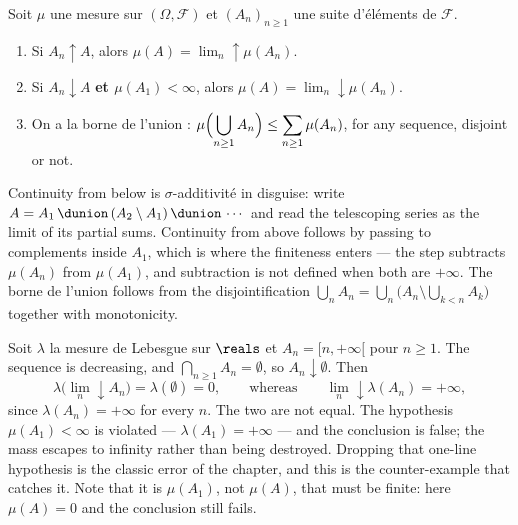 \begin{prop}
  Soit $\mu$ une mesure sur $(\Omega,\mathcal{F})$ et $(A_{n})_{n \geq 1}$ une suite
  d'éléments de $\mathcal{F}$.
  \begin{enumerate}
    \item Si $A_{n} \uparrow A$, alors $\mu(A) = \lim_{n} \uparrow \mu(A_{n})$.
    \item Si $A_{n} \downarrow A$ \textbf{et $\mu(A_{1}) < \infty$}, alors $\mu(A) =
      \lim_{n} \downarrow \mu(A_{n})$.
    \item On a la borne de l'union :
      $\displaystyle \mu\Bigl(\bigcup_{n \geq 1} A_{n}\Bigr) \leq \sum_{n \geq 1}
      \mu(A_{n})$, for any sequence, disjoint or not.
  \end{enumerate}
\end{prop}

\begin{remark}
  Continuity from below is $\sigma$-additivité in disguise: write $A = A_{1}
  \,\dunion\, (A_{2} \setminus A_{1}) \,\dunion\, \cdots$ and read the
  telescoping series as the limit of its partial sums. Continuity from above follows
  by passing to complements inside $A_{1}$, which is where the finiteness enters ---
  the step subtracts $\mu(A_{n})$ from $\mu(A_{1})$, and subtraction is not defined
  when both are $+\infty$. The borne de l'union follows from the disjointification
  $\bigcup_{n} A_{n} = \bigcup_{n} \bigl(A_{n} \setminus \bigcup_{k<n} A_{k}\bigr)$
  together with monotonicity.
\end{remark}

\begin{example}
  Soit $\lambda$ la mesure de Lebesgue sur $\reals$ et $A_{n} = [n,+\infty[$ pour
  $n \geq 1$. The sequence is decreasing, and $\bigcap_{n \geq 1} A_{n} = \emptyset$,
  so $A_{n} \downarrow \emptyset$. Then
  \[
    \lambda\bigl(\lim_{n} \downarrow A_{n}\bigr) = \lambda(\emptyset) = 0,
    \qquad\text{whereas}\qquad
    \lim_{n} \downarrow \lambda(A_{n}) = +\infty,
  \]
  since $\lambda(A_{n}) = +\infty$ for every $n$. The two are not equal. The
  hypothesis $\mu(A_{1}) < \infty$ is violated --- $\lambda(A_{1}) = +\infty$ --- and
  the conclusion is false; the mass escapes to infinity rather than being destroyed.
  Dropping that one-line hypothesis is the classic error of the chapter, and this is
  the counter-example that catches it. Note that it is $\mu(A_{1})$, not $\mu(A)$,
  that must be finite: here $\mu(A) = 0$ and the conclusion still fails.
\end{example}


